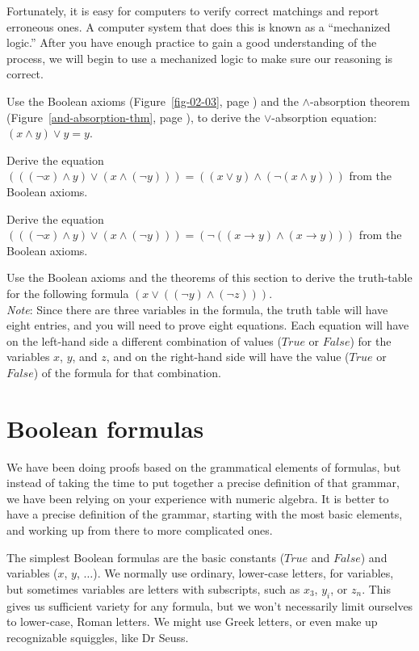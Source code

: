 Fortunately, it is easy for computers to verify
correct matchings and report erroneous ones.
A computer system that does this is known as a ``mechanized logic.''
After you have enough practice to gain a good understanding of the process,
we will begin to use a mechanized logic to make sure our reasoning is correct.

\begin{ExerciseList}
\Exercise
Use the Boolean axioms (Figure~\ref{fig-02-03}, page \pageref{fig-02-03})
and the $\wedge$-absorption theorem
(Figure~\ref{and-absorption-thm}, page \pageref{and-absorption-thm}),
to derive the $\vee$-absorption equation: $(x \wedge y) \vee y = y$.

\Exercise
Derive the equation
$(((\neg x) \wedge y) \vee (x \wedge (\neg y))) = ((x \vee y) \wedge (\neg(x \wedge y)))$
from the Boolean axioms.

\Exercise
Derive the equation
$(((\neg x) \wedge y) \vee (x \wedge (\neg y))) = (\neg((x \rightarrow y) \wedge (x \rightarrow y)))$
from the Boolean axioms.

\Exercise
Use the Boolean axioms
and the theorems of this section to
derive the truth-table for the following formula $(x \vee ((\neg y) \wedge (\neg z)))$.\\
\emph{Note}: Since there are three variables in the formula, the truth table
will have eight entries, and you will need to prove eight equations.
Each equation will have on the left-hand side
a different combination of values ($True$ or $False$) for the variables $x$, $y$, and $z$,
and on the right-hand side will have the value ($True$ or $False$) of the formula for that combination.
\end{ExerciseList}

\section{Boolean formulas}
\label{sec:boolean-formuas}

We have been doing proofs based on the grammatical elements of formulas,
but instead of taking the time to put together a precise definition of that grammar,
we have been relying on your experience with numeric algebra.
It is better to have a precise definition of the grammar,
starting with the most basic elements,
and working up from there to more complicated ones.

The simplest Boolean formulas are the basic constants ($True$ and $False$)
and variables ($x$, $y$, $\dots$). We normally use ordinary, lower-case letters,
for variables, but sometimes variables are letters with subscripts,
such as $x_3$, $y_i$, or $z_n$.
This gives us sufficient variety for any formula,
but we won't necessarily limit ourselves to lower-case, Roman letters.
We might use Greek letters, or
even make up recognizable squiggles, like Dr Seuss.


